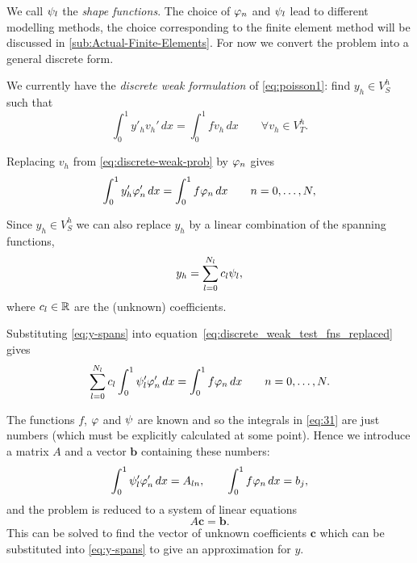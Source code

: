 We call $\psi_l$ the \emph{shape functions}. The choice of $\varphi_{n}$
and $\psi_l$ lead to different modelling methods, the choice corresponding
to the finite element method will be discussed in \autoref{sub:Actual-Finite-Elements}. For now we convert the problem into a general discrete form.

We currently have the \emph{discrete weak formulation} of \eqref{eq:poisson1}: find $y_{h}\in V_{S}^{h}$ such that
\begin{equation}
  \int_{0}^{1}y'_{h}v_{h}'\, dx=\int_{0}^{1}fv_{h}\, dx\qquad\forall v_{h}\in V_{T}^{h}.
  \label{eq:discrete-weak-prob}
\end{equation}

Replacing $v_{h}$ from \eqref{eq:discrete-weak-prob} by $\varphi_{n}$
gives
\begin{equation}
  \int_{0}^{1} y'_{h} \varphi_{n}' \, dx = \int_{0}^{1}f\varphi_{n}\, dx\qquad n=0,\ldots,N,
  \label{eq:discrete_weak_test_fns_replaced}
\end{equation}

Since $y_{h}\in V_{S}^{h}$ we can also replace $y_{h}$ by a linear combination
of the spanning functions, \ie
\begin{equation}
  y_{h}=\sum_{l=0}^{N_l}c_{l}\psi_{l},
  \label{eq:y-spans}
\end{equation}
where $c_l \in \mathbb{R}$ are the (unknown) coefficients.

Substituting \eqref{eq:y-spans} into equation~\eqref{eq:discrete_weak_test_fns_replaced} gives
\begin{equation}
  \sum_{l=0}^{N_l}c_{l}\int_{0}^{1}\psi_{l}'\varphi'_{n}\, dx=\int_{0}^{1}f\varphi_{n}\, dx
  \qquad n=0,\ldots,N.
  \label{eq:31}
\end{equation}

The functions $f$, $\varphi$ and $\psi$ are known and so the integrals in \eqref{eq:31} are just numbers (which must be explicitly calculated at some point). Hence we introduce a matrix $A$ and a vector $\mathbf{b}$ containing these numbers:
\begin{equation}
  \int_{0}^{1}\psi_{l}'\varphi'_{n}\, dx=A_{ln},\qquad\int_{0}^{1}f\varphi_{n}\, dx=b_{j},\label{eq:Aij_bj}
\end{equation}
and the problem is reduced to a system of linear equations
\begin{equation}
  A\mathbf{c} = \mathbf{b}.
  \label{eq:final_galerkin}
\end{equation}
This can be solved to find the vector of unknown coefficients $\mathbf{c}$ which can be substituted into \eqref{eq:y-spans} to give an approximation for $y$.



